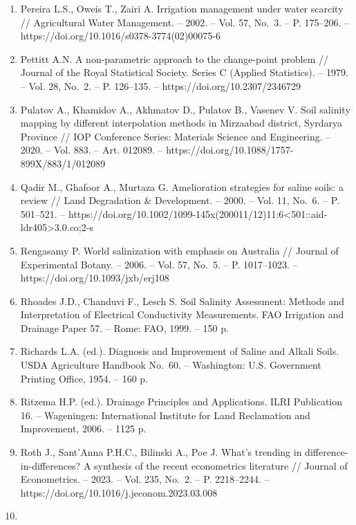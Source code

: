 \begin{enumerate}
  variations in the Amu Darya Delta // Water. -- 2020. -- Vol. 12,
  No.~10. -- Art. 2869. -- https://doi.org/10.3390/w12102869
\item
  Pereira L.S., Oweis T., Zairi A. Irrigation management under water
  scarcity // Agricultural Water Management. -- 2002. -- Vol. 57, No.~3.
  -- P. 175--206. -- https://doi.org/10.1016/s0378-3774(02)00075-6
\item
  Pettitt A.N. A non-parametric approach to the change-point problem //
  Journal of the Royal Statistical Society. Series C (Applied
  Statistics). -- 1979. -- Vol. 28, No.~2. -- P. 126--135. --
  https://doi.org/10.2307/2346729
\item
  Pulatov A., Khamidov A., Akhmatov D., Pulatov B., Vasenev V. Soil
  salinity mapping by different interpolation methods in Mirzaabad
  district, Syrdarya Province // IOP Conference Series: Materials
  Science and Engineering. -- 2020. -- Vol. 883. -- Art. 012089. --
  https://doi.org/10.1088/1757-899X/883/1/012089
\item
  Qadir M., Ghafoor A., Murtaza G. Amelioration strategies for saline
  soils: a review // Land Degradation \& Development. -- 2000. -- Vol.
  11, No.~6. -- P. 501--521. --
  https://doi.org/10.1002/1099-145x(200011/12)11:6\textless501::aid-ldr405\textgreater3.0.co;2-s
\item
  Rengasamy P. World salinization with emphasis on Australia // Journal
  of Experimental Botany. -- 2006. -- Vol. 57, No.~5. -- P. 1017--1023.
  -- https://doi.org/10.1093/jxb/erj108
\item
  Rhoades J.D., Chanduvi F., Lesch S. Soil Salinity Assessment: Methods
  and Interpretation of Electrical Conductivity Measurements. FAO
  Irrigation and Drainage Paper 57. -- Rome: FAO, 1999. -- 150 p.
\item
  Richards L.A. (ed.). Diagnosis and Improvement of Saline and Alkali
  Soils. USDA Agriculture Handbook No.~60. -- Washington: U.S.
  Government Printing Office, 1954. -- 160 p.
\item
  Ritzema H.P. (ed.). Drainage Principles and Applications. ILRI
  Publication 16. -- Wageningen: International Institute for Land
  Reclamation and Improvement, 2006. -- 1125 p.
\item
  Roth J., Sant'Anna P.H.C., Bilinski A., Poe J. What's trending in
  difference-in-differences? A synthesis of the recent econometrics
  literature // Journal of Econometrics. -- 2023. -- Vol. 235, No.~2. --
  P. 2218--2244. -- https://doi.org/10.1016/j.jeconom.2023.03.008
\item

\end{enumerate}
